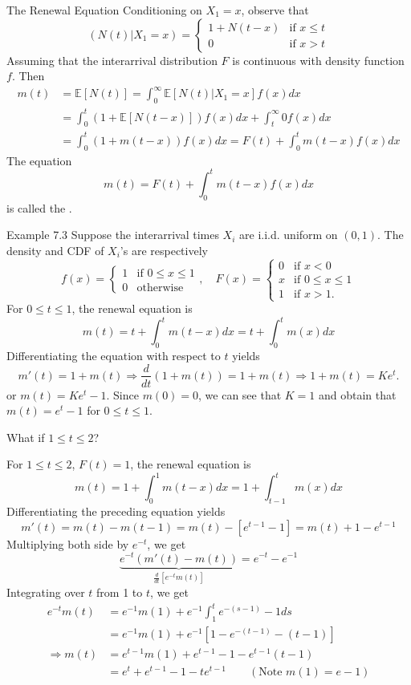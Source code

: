 \documentclass[letterpaper,handout, mathserif]{beamer}
\def\E{\mathbb E}
\begin{document}
\begin{frame}{The Renewal Equation}
Conditioning on $X_1=x$, observe that
$$(N(t)|X_1=x)
=\begin{cases}
1+N(t-x) &\text{if }x\le t\\
0 & \text{if }x> t
\end{cases}
$$
Assuming that the interarrival distribution
$F$ is continuous with density function $f$. Then
\begin{align*}
m(t)&=\E[N(t)]=\int_0^{\infty}\E[N(t)|X_1=x]f(x)dx\\
&=\int_0^t(1+\E[N(t-x)])f(x)dx+\int_t^{\infty} 0 f(x)dx\\
&=\int_0^t(1+m(t-x))f(x)dx=F(t)+\int_0^t m(t-x)f(x)dx
\end{align*}
The equation $$m(t)=F(t)+\int_0^t m(t-x)f(x)dx$$ is called the .
\end{frame}
\begin{frame}{Example 7.3}
Suppose the interarrival times $X_i$ are i.i.d. uniform on $(0, 1)$. The density and CDF of $X_i$'s are respectively
$$f(x)=
\begin{cases}
1 & \text{if }0\le x\le 1\\
0 & \text{otherwise}
\end{cases},\quad
F(x)=
\begin{cases}
0 & \text{if } x< 0\\[-3pt]
x & \text{if }0\le x\le 1\\[-3pt]
1 & \text{if } x> 1.
\end{cases}
$$
For $0\le t\le1$, the renewal equation is
$$m(t) = t +\int_0^{t} m(t-x)dx = t + \int_{0}^t m(x)dx$$
Differentiating the equation with respect to $t$ yields
$$m'(t)= 1+m(t)\Rightarrow \frac{d}{dt}(1+m(t))=1+m(t)\Rightarrow 1+m(t)=Ke^t.$$
or $m(t)=Ke^t-1$. Since $m(0)=0$, we can see that $K=1$ and obtain that
$m(t)=e^t-1$ for $0\le t\le1$.\par\medskip

What if $1\le t\le 2$?
\end{frame}
\begin{frame}
For $1\le t\le 2$, $F(t)=1$, the renewal equation is
$$m(t) = 1 + \int_{0}^1 m(t-x)dx = 1 + \int_{t-1}^t m(x)dx$$
Differentiating the preceding equation yields
$$m'(t)= m(t)-m(t-1)=m(t)-[e^{t-1}-1]=m(t)+1-e^{t-1}$$
Multiplying both side by $e^{-t}$, we get
$$\underbrace{e^{-t}(m'(t)-m(t))}_{\frac{d}{dt}[e^{-t}m(t)]}=e^{-t}-e^{-1}$$
Integrating over $t$ from 1 to $t$, we get
\begin{align*}
e^{-t}m(t)&=e^{-1}m(1)+ e^{-1}\int_1^t e^{-(s-1)}-1ds\\
&=e^{-1}m(1)+e^{-1}[1-e^{-(t-1)}-(t-1)]\\
\Rightarrow m(t)&=e^{t-1}m(1)+e^{t-1}-1-e^{t-1}(t-1)\\
&=e^t+e^{t-1}-1-te^{t-1}\qquad (\text{Note }m(1)=e-1)
\end{align*}
\end{frame}
\end{document}

